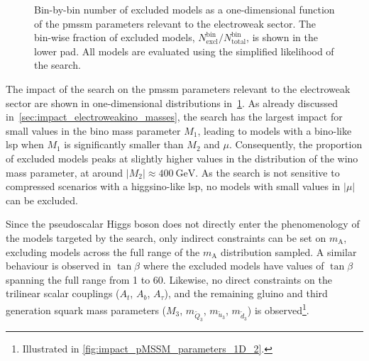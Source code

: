 \begin{figure}
\begin{subfigure}[b]{0.5\linewidth}
	\end{subfigure}\hfill
	\caption{Bin-by-bin number of excluded models as a one-dimensional function of the \gls{pmssm} parameters relevant to the electroweak sector. The bin-wise fraction of excluded models, $N^\mathrm{bin}_\mathrm{excl} / N^\mathrm{bin}_\mathrm{total}$, is shown in the lower pad. All models are evaluated using the simplified likelihood of the \onelepton search.}
	\label{fig:impact_pMSSM_parameters_1D}
\end{figure}

The impact of the \onelepton search on the \gls{pmssm} parameters relevant to the electroweak sector are shown in one-dimensional distributions in~\cref{fig:impact_pMSSM_parameters_1D}. As already discussed in~\cref{sec:impact_electroweakino_masses}, the \onelepton search has the largest impact for small values in the bino mass parameter $M_1$, leading to models with a bino-like \gls{lsp} when $M_1$ is significantly smaller than $M_2$ and $\mu$.
Consequently, the proportion of excluded models peaks at slightly higher values in the distribution of the wino mass parameter, \ie at around $\vert M_2\vert\approx\SI{400}{\GeV}$. As the search is not sensitive to compressed scenarios with a higgsino-like \gls{lsp}, no models with small values in $\vert\mu\vert$ can be excluded. 

Since the pseudoscalar Higgs boson does not directly enter the phenomenology of the models targeted by the \onelepton search, only indirect constraints can be set on $m_\mathrm{A}$, excluding models across the full range of the $m_\mathrm{A}$ distribution sampled.
A similar behaviour is observed in $\tan\beta$ where the excluded models have values of $\tan\beta$ spanning the full range from 1 to 60.
Likewise, no direct constraints on the trilinear scalar couplings ($A_t$, $A_b$, $A_\tau$), and the remaining gluino and third generation squark mass parameters ($M_3$, $m_{\tilde{Q}_3}$, $m_{\tilde{u}_3}$, $m_{\tilde{d}_3}$) is observed\footnote{Illustrated in \cref{fig:impact_pMSSM_parameters_1D_2}.}. 


